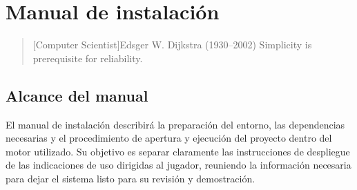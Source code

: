 \chapter{Manual de instalación}

\begin{quotation}[Computer Scientist]{Edsger W. Dijkstra (1930--2002)}
Simplicity is prerequisite for reliability.
\end{quotation}

\begin{abstract}
Este capítulo se reserva para documentar los pasos necesarios para desplegar y ejecutar
\textit{Via Inferni} en un entorno local de desarrollo o de demostración. Con él se abre
la parte de cierre del proyecto, centrada en consolidar el resultado final desde el punto
de vista documental y operativo antes de la entrega definitiva.
\end{abstract}

\section{Alcance del manual}
El manual de instalación describirá la preparación del entorno, las dependencias necesarias
y el procedimiento de apertura y ejecución del proyecto dentro del motor utilizado. Su
objetivo es separar claramente las instrucciones de despliegue de las indicaciones de uso
dirigidas al jugador, reuniendo la información necesaria para dejar el sistema listo para
su revisión y demostración.
